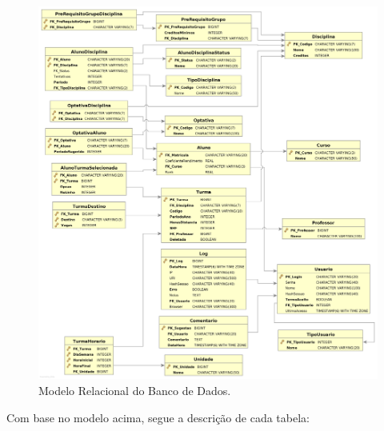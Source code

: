 \documentclass[graduacao,brazil]{ThesisPUC}
\begin{document}
\begin{figure}[H]
    \centering
    \includegraphics[width=\linewidth]{img/dbvisualizer.png}
    \caption{Modelo Relacional do Banco de Dados.}
\end{figure}

Com base no modelo acima, segue a descrição de cada tabela:
\end{document}
